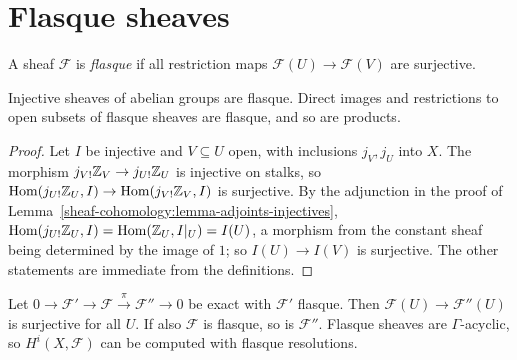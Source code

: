 \section{Flasque sheaves}\label{sheaf-cohomology:section-flasque}

\begin{definition}\label{sheaf-cohomology:definition-flasque}
A sheaf $\mathcal{F}$ is \emph{flasque} if all restriction maps $\mathcal{F}(U) \to \mathcal{F}(V)$ are surjective.
\end{definition}

\begin{lemma}\label{sheaf-cohomology:lemma-injective-flasque}
Injective sheaves of abelian groups are flasque. Direct images and restrictions to open subsets of flasque sheaves are flasque, and so are products.
\end{lemma}

\begin{proof}
Let $I$ be injective and $V \subseteq U$ open, with inclusions $j_V, j_U$ into $X$. The morphism $j_{V!}\mathbb{Z}_V \to j_{U!}\mathbb{Z}_U$ is injective on stalks, so
$\operatorname{Hom}(j_{U!}\mathbb{Z}_U, I) \to \operatorname{Hom}(j_{V!}\mathbb{Z}_V, I)$ is surjective. By the adjunction in the proof of Lemma~\ref{sheaf-cohomology:lemma-adjoints-injectives},
$\operatorname{Hom}(j_{U!}\mathbb{Z}_U, I) = \operatorname{Hom}(\mathbb{Z}_U, I|_U) = I(U)$, a morphism from the constant sheaf being determined by the image of $1$; so $I(U) \to I(V)$ is surjective. The other statements are
immediate from the definitions.
\end{proof}

\begin{proposition}\label{sheaf-cohomology:proposition-flasque}
Let $0 \to \mathcal{F}' \to \mathcal{F} \xrightarrow{\pi} \mathcal{F}'' \to 0$ be exact with $\mathcal{F}'$ flasque. Then $\mathcal{F}(U) \to \mathcal{F}''(U)$ is surjective for all $U$. If also $\mathcal{F}$ is
flasque, so is $\mathcal{F}''$. Flasque sheaves are $\Gamma$-acyclic, so $H^i(X, \mathcal{F})$ can be computed with flasque resolutions.
\end{proposition}

